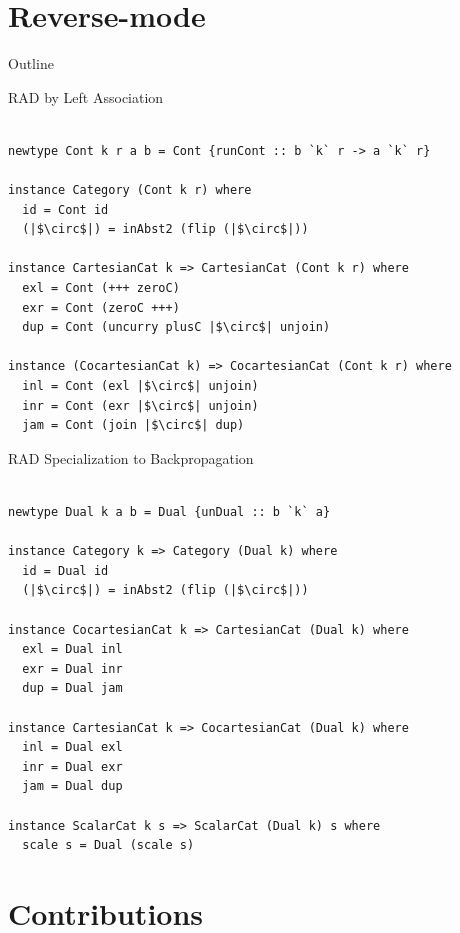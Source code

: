 \documentclass[12pt]{beamer}
\begin{document}
\section{Reverse-mode}

\begin{frame}{Outline}
\tableofcontents[currentsection]
\end{frame}

\begin{frame}[fragile]{RAD by Left Association}
  \begin{verbatim}

newtype Cont k r a b = Cont {runCont :: b `k` r -> a `k` r}

instance Category (Cont k r) where
  id = Cont id
  (|$\circ$|) = inAbst2 (flip (|$\circ$|))

instance CartesianCat k => CartesianCat (Cont k r) where
  exl = Cont (+++ zeroC)
  exr = Cont (zeroC +++)
  dup = Cont (uncurry plusC |$\circ$| unjoin)

instance (CocartesianCat k) => CocartesianCat (Cont k r) where
  inl = Cont (exl |$\circ$| unjoin)
  inr = Cont (exr |$\circ$| unjoin)
  jam = Cont (join |$\circ$| dup)

\end{verbatim}
\end{frame}

\begin{frame}[fragile]{RAD Specialization to Backpropagation}
  \begin{verbatim}

newtype Dual k a b = Dual {unDual :: b `k` a}

instance Category k => Category (Dual k) where
  id = Dual id
  (|$\circ$|) = inAbst2 (flip (|$\circ$|))

instance CocartesianCat k => CartesianCat (Dual k) where
  exl = Dual inl
  exr = Dual inr
  dup = Dual jam

instance CartesianCat k => CocartesianCat (Dual k) where
  inl = Dual exl
  inr = Dual exr
  jam = Dual dup

instance ScalarCat k s => ScalarCat (Dual k) s where
  scale s = Dual (scale s)

\end{verbatim}
\end{frame}

\section{Contributions}
\end{document}
